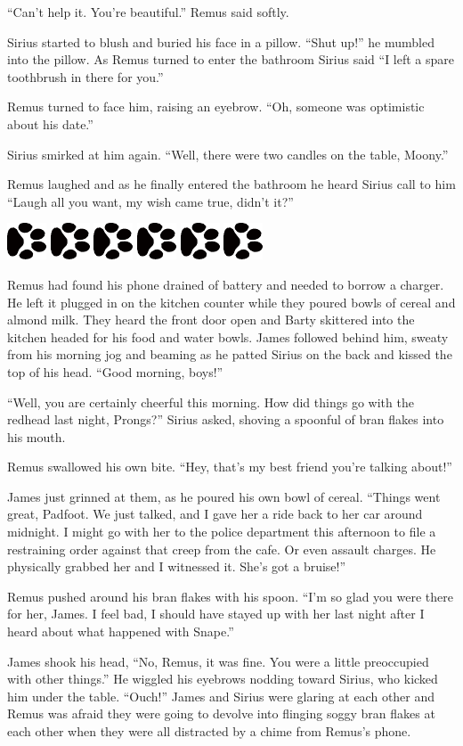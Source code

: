 \documentclass[12pt,twoside,openright]{memoir}
\newcommand{\myrulez}{	
	\begin{center}
		\hspace{.5em}
		\includegraphics[angle=60]{dogprint.pdf}
		\hspace{.5em}
		\includegraphics[angle=120]{dogprint.pdf}
		\hspace{.5em}
		\includegraphics[angle=60]{dogprint.pdf}
		\hspace{.5em}
		\includegraphics[angle=120]{dogprint.pdf}
		\hspace{.5em}
		\includegraphics[angle=60]{dogprint.pdf}
		\hspace{.5em}
		\includegraphics[angle=120]{dogprint.pdf}
		\hspace{.5em}
	\end{center}
}
\begin{document}
``Can't help it. You're beautiful.'' Remus said softly.

Sirius started to blush and buried his face in a pillow. ``Shut up!'' he mumbled into the pillow. As Remus turned to enter the bathroom Sirius said ``I left a spare toothbrush in there for you.''

Remus turned to face him, raising an eyebrow. ``Oh, someone was optimistic about his date.''

Sirius smirked at him again. ``Well, there were two candles on the table, Moony.''

Remus laughed and as he finally entered the bathroom he heard Sirius call to him ``Laugh all you want, my wish came true, didn't it?''

\myrulez

Remus had found his phone drained of battery and needed to borrow a charger. He left it plugged in on the kitchen counter while they poured bowls of cereal and almond milk. They heard the front door open and Barty skittered into the kitchen headed for his food and water bowls. James followed behind him, sweaty from his morning jog and beaming as he patted Sirius on the back and kissed the top of his head. ``Good morning, boys!''

``Well, you are certainly cheerful this morning. How did things go with the redhead last night, Prongs?'' Sirius asked, shoving a spoonful of bran flakes into his mouth.

Remus swallowed his own bite. ``Hey, that's my best friend you're talking about!''

James just grinned at them, as he poured his own bowl of cereal. ``Things went great, Padfoot. We just talked, and I gave her a ride back to her car around midnight. I might go with her to the police department this afternoon to file a restraining order against that creep from the cafe. Or even assault charges. He physically grabbed her and I witnessed it. She's got a bruise!''

Remus pushed around his bran flakes with his spoon. ``I'm so glad you were there for her, James. I feel bad, I should have stayed up with her last night after I heard about what happened with Snape.''

James shook his head, ``No, Remus, it was fine. You were a little preoccupied with other things.'' He wiggled his eyebrows nodding toward Sirius, who kicked him under the table. ``Ouch!'' James and Sirius were glaring at each other and Remus was afraid they were going to devolve into flinging soggy bran flakes at each other when they were all distracted by a chime from Remus's phone.
\end{document}

